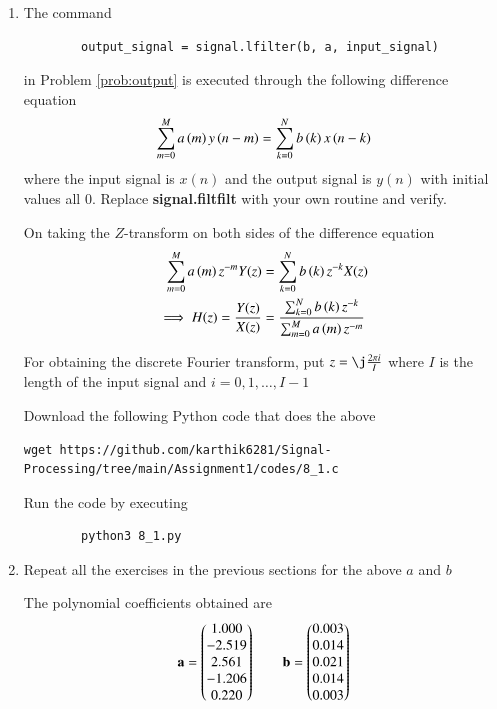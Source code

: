 \documentclass[journal,12pt,twocolumn]{IEEEtran}
\renewcommand\thesection{\arabic{section}}
\begin{document}
\begin{enumerate}[label=\thesection.\arabic*]
	\item The command
	\begin{lstlisting}
		output_signal = signal.lfilter(b, a, input_signal)
	\end{lstlisting}
	in Problem \ref{prob:output} is executed through the following difference equation
	\begin{equation}
		\label{eq:iir_filter_gen}
		\sum _{m=0}^{M}a\left(m\right)y\left(n-m\right)=\sum _{k=0}^{N}b\left(k\right)x\left(n-k\right)
	\end{equation}
	where the input signal is $x(n)$ and the output signal is $y(n)$ with initial values all 0. Replace \textbf{signal.filtfilt} with your own routine and verify.
	
	\solution On taking the $Z$-transform on both sides of the difference equation
	\begin{align}
		\sum _{m=0}^{M}a\left(m\right) z^{-m} Y(z) &= \sum _{k=0}^{N}b\left(k\right) z^{-k} X(z) \\
		\implies H(z) = \frac{Y(z)}{X(z)} &= \frac{\sum _{k=0}^{N}b\left(k\right) z^{-k}}{\sum _{m=0}^{M}a\left(m\right) z^{-m}}
	\end{align}
	
	For obtaining the discrete Fourier transform, put $z = \j \frac{2\pi i}{I}$ where $I$ is the length of the input signal and $i = 0, 1, \ldots, I-1$
	
	Download the following Python code that does the above
	\begin{lstlisting}
wget https://github.com/karthik6281/Signal-Processing/tree/main/Assignment1/codes/8_1.c
	\end{lstlisting}
	
	Run the code by executing
	\begin{lstlisting}
		python3 8_1.py
	\end{lstlisting}
	
	\item Repeat all the exercises in the previous sections for the above $a$ and $b$
	
	\solution The polynomial coefficients obtained are
	\begin{align}
		\mathbf{a} = \begin{pmatrix}1.000 \\ -2.519 \\ 2.561 \\ -1.206 \\ 0.220\end{pmatrix} \qquad
		\mathbf{b} = \begin{pmatrix}0.003 \\ 0.014 \\ 0.021 \\ 0.014 \\ 0.003\end{pmatrix}
	\end{align}
	

\end{enumerate}
\end{document}
